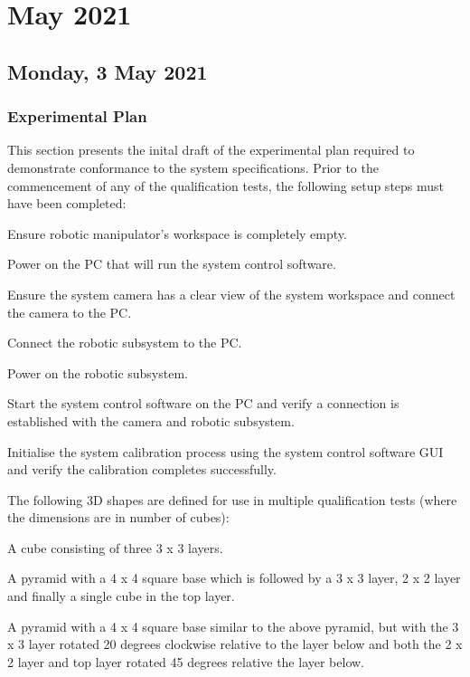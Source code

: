 \chapter[2021 May]{May 2021}

\section[2021/05/03]{Monday, 3 May 2021}

\subsection{Experimental Plan}

This section presents the inital draft of the experimental plan required to demonstrate conformance to the system specifications. Prior to the commencement of any of the qualification tests, the following setup steps must have been completed:

\begin{compactenum}
    \item Ensure robotic manipulator's workspace is completely empty.
    \item Power on the PC that will run the system control software.
    \item Ensure the system camera has a clear view of the system workspace and connect the camera to the PC.
    \item Connect the robotic subsystem to the PC.
    \item Power on the robotic subsystem.
    \item Start the system control software on the PC and verify a connection is established with the camera and robotic subsystem.
    \item Initialise the system calibration process using the system control software GUI and verify the calibration completes successfully.
\end{compactenum}

The following 3D shapes are defined for use in multiple qualification tests (where the dimensions are in number of cubes):

\begin{compactenum}
        \item A cube consisting of three 3 x 3 layers.
        \item A pyramid with a 4 x 4 square base which is followed by a 3 x 3 layer, 2 x 2 layer and finally a single cube in the top layer.
        \item A pyramid with a 4 x 4 square base similar to the above pyramid, but with the 3 x 3 layer rotated 20 degrees clockwise relative to the layer below and both the 2 x 2 layer and top layer rotated 45 degrees relative the layer below.
\end{compactenum}

